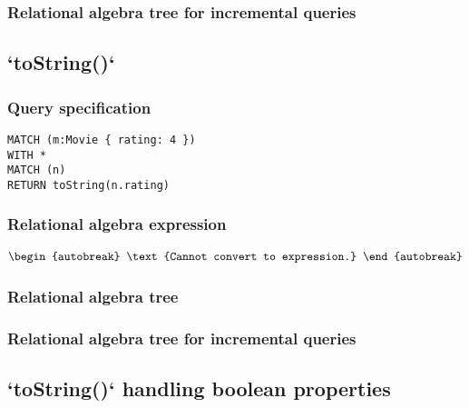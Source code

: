 \subsubsection*{Relational algebra tree for incremental queries}


\subsection{`toString()`}

\subsubsection*{Query specification}

\begin{lstlisting}
MATCH (m:Movie { rating: 4 })
WITH *
MATCH (n)
RETURN toString(n.rating)
\end{lstlisting}

\subsubsection*{Relational algebra expression}

\begin{align*}
\begin{autobreak}
\text{Cannot convert to expression.}
\end{autobreak}
\end{align*}

\subsubsection*{Relational algebra tree}


\subsubsection*{Relational algebra tree for incremental queries}


\subsection{`toString()` handling boolean properties}

